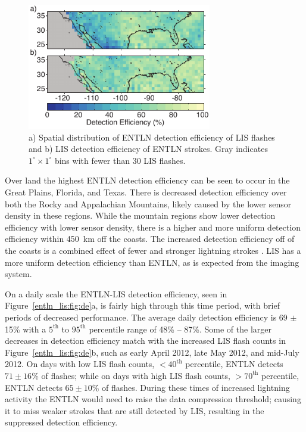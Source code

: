 \begin{figure}[t]
   \centering
   \noindent\includegraphics[width=19pc,angle=0]{entln_lis/Figures/map.pdf}
   \caption{a) Spatial distribution of ENTLN detection efficiency of LIS flashes and
   		b) LIS detection efficiency of ENTLN strokes.
   		Gray indicates $1^\circ \times 1^\circ$ bins with fewer than 30 LIS flashes.
		}
   \label{entln_lis:fig:map}
\end{figure}

Over land the highest ENTLN detection efficiency can be seen to occur in the Great Plains, Florida, and Texas.
There is decreased detection efficiency over both the Rocky and Appalachian Mountains, likely caused by the lower sensor density in these regions.
While the mountain regions show lower detection efficiency with lower sensor density, there is a higher and more uniform detection efficiency within 450~km off the coasts.
The increased detection efficiency off of the coasts is a combined effect of fewer and stronger lightning strokes \citep{Hutchins2013, Rudlosky2010}.
LIS has a more uniform detection efficiency than ENTLN, as is expected from the imaging system.

On a daily scale the ENTLN-LIS detection efficiency, seen in Figure~\ref{entln_lis:fig:de}a, is fairly high through this time period, with brief periods of decreased performance.
The average daily detection efficiency is 69 $\pm$ 15\% with a $5^\text{th}$ to $95^\text{th}$ percentile range of 48\% -- 87\%.
Some of the larger decreases in detection efficiency match with the increased LIS flash counts in Figure~\ref{entln_lis:fig:de}b, such as early April 2012, late May 2012, and mid-July 2012.
On days with low LIS flash counts, $<40^\text{th}$ percentile, ENTLN detects $71\pm16$\% of flashes; while on days with high LIS flash counts, $>70^\text{th}$ percentile, ENTLN detects $65\pm10$\% of flashes.
During these times of increased lightning activity the ENTLN would need to raise the data compression threshold; causing it to miss weaker strokes that are still detected by LIS, resulting in the suppressed detection efficiency.

